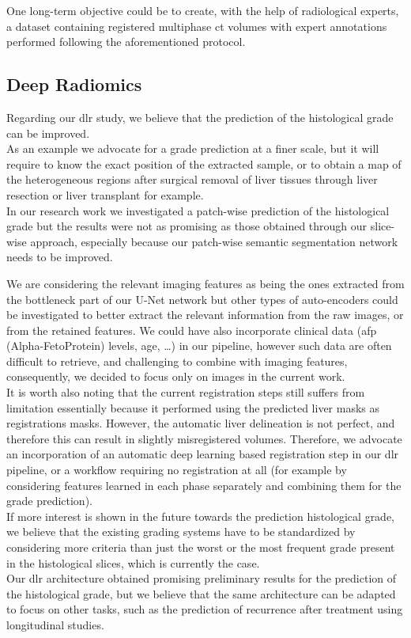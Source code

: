 One long-term objective could be to create, with the help of
radiological experts, a dataset containing registered multiphase \ac{ct}
volumes with expert annotations performed following the aforementioned
protocol.

\subsection*{Deep Radiomics}
\label{subsec:DCR}

Regarding our \ac{dlr} study, we believe that the prediction of the
histological grade can be improved. \\
As an example we advocate for a grade prediction at a finer
scale, but it will require to know the exact position of the extracted
sample, or to obtain a map of the heterogeneous regions after surgical
removal of liver tissues through liver resection or liver transplant for
example.\\
In our research work we investigated a patch-wise prediction of the
histological grade but the results were not as promising as those
obtained through our slice-wise approach, especially because our
patch-wise semantic segmentation network needs to be improved.

We are considering the relevant imaging features as being the
ones extracted from the bottleneck part of our U-Net network but other
types of auto-encoders could be investigated to better
extract the relevant information from the raw images, or from the
retained features. We could have also incorporate clinical
data (\ac{afp} (Alpha-FetoProtein) levels, age, \ldots{}) in our pipeline, however such data are
often difficult to retrieve, and challenging to combine with imaging
features, consequently, we decided to focus only on images in the
current work.\\
It is worth also noting that the current registration steps still suffers from limitation
essentially because it performed using the predicted liver masks as registrations masks. However, the automatic liver delineation is not perfect, and therefore this can result in slightly misregistered volumes. Therefore, we advocate an incorporation of an automatic deep learning based registration step in our \ac{dlr} pipeline, or a workflow requiring no registration at all (for example by considering features learned in each phase separately and combining them for the grade prediction).\\
If more interest is shown in the future towards the prediction
histological grade, we believe that the existing grading systems have to
be standardized by considering more criteria than just the worst or the
most frequent grade present in the histological slices, which is
currently the case.\\
Our \ac{dlr} architecture obtained promising preliminary results for the prediction of
the histological grade, but we believe that the same architecture can be
adapted to focus on other tasks, such as the prediction of
recurrence after treatment using longitudinal studies.
